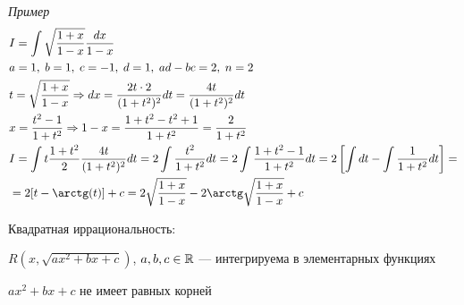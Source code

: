 \documentclass{article}
\begin{document}
{\it Пример}
\begin{align*}
	 & I=\int\sqrt{\frac{1+x}{1-x}}\frac{dx}{1-x}                                                    \\
	 & a=1,\;b=1,\;c=-1,\;d=1,\;ad-bc=2,\;n=2                                                        \\
	 & t=\sqrt{\frac{1+x}{1-x}}\Rarr dx=\frac{2t\cdot 2}{(1+t^{2})^{2}}dt=\frac{4t}{(1+t^{2})^{2}}dt \\
	 & x=\frac{t^{2}-1}{1+t^{2}}\Rarr 1-x=\frac{1+t^{2}-t^{2}+1}{1+t^{2}}=\frac{2}{1+t^{2}}          \\
	 & I=\int t\frac{1+t^{2}}{2}\frac{4t}{(1+t^{2})^{2}}dt=2\int\frac{t^{2}}{1+t^{2}}dt
	=2\int\frac{1+t^{2}-1}{1+t^{2}}dt=2\left[\int dt-\int\frac{1}{1+t^{2}}dt\right]=                 \\
	 & =2[t-\arctg(t)]+c=2\sqrt{\frac{1+x}{1-x}}-2\arctg\sqrt{\frac{1+x}{1-x}}+c
\end{align*}

\pagebreak

\theorem

Квадратная иррациональность:

$\displaystyle R(x,\sqrt{ax^{2}+bx+c})$, $a,b,c\in\mathbb{R}$ --- интегрируема в элементарных функциях

$ax^{2}+bx+c$ не имеет равных корней
\end{document}

